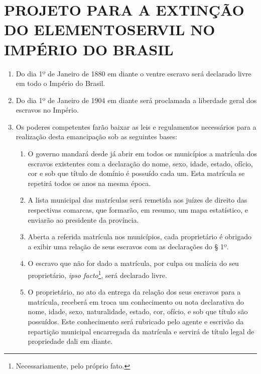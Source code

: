 \section*{PROJETO PARA A EXTINÇÃO DO ELEMENTO\break SERVIL NO IMPÉRIO DO BRASIL}

\begin{enumerate}[label=Art. \arabic*º]
\item Do dia 1º de Janeiro de 1880 em diante o ventre escravo será
declarado livre em todo o Império do Brasil.

\item Do dia 1º de Janeiro de 1904 em diante será proclamada a
liberdade geral dos escravos no Império.

\item Os poderes competentes farão baixar as leis e regulamentos
necessários para a realização desta emancipação sob as seguintes
bases:

\begin{enumerate}[label=§ \arabic*º]
\item O governo mandará desde já abrir em todos os municípios a
matrícula dos escravos existentes com a declaração do nome, sexo, idade,
estado, ofício, cor e sob que título de domínio é possuído cada um. Esta
matrícula se repetirá todos os anos na mesma época.

\item A lista municipal das matrículas será remetida aos juízes de
direito das respectivas comarcas, que formarão, em resumo, um mapa
estatístico, e enviarão ao presidente da província.

\item Aberta a referida matrícula nos municípios, cada proprietário é
obrigado a exibir uma relação de seus escravos com as declarações do § 1º.

\item O escravo que não for dado a matrícula, por culpa ou malícia do
seu proprietário, \emph{ipso facto}\footnote{Necessariamente, pelo
  próprio fato.}, será declarado livre.

\item O proprietário, no ato da entrega da relação dos seus escravos
para a matrícula, receberá em troca um conhecimento ou nota declarativa
do nome, idade, sexo, naturalidade, estado, cor, ofício, e sob que
título são possuídos. Este conhecimento será rubricado pelo agente e
escrivão da repartição municipal encarregada da matrícula e servirá de
título legal de propriedade dali em diante.
\end{enumerate}


\end{enumerate}
